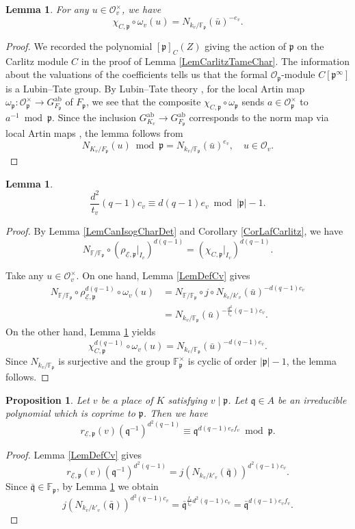 \documentclass[10pt]{amsart}
\theoremstyle{plain}
\newtheorem{prop}[thm]{Proposition}
\newtheorem{lem}[thm]{Lemma}
\theoremstyle{definition}
\newcommand{\ab}{\mathrm{ab}}
\newcommand{\cO}{\mathcal{O}}
\newcommand{\ucE}{\underline{\mathcal{E}}}
\newcommand{\bF}{\mathbb{F}}
\newcommand{\frp}{\mathfrak{p}}
\newcommand{\frq}{\mathfrak{q}}
\begin{document}
\begin{lem}\label{LemCarlitzBaseChange}
	For any $u\in \cO_v^\times$, we have
	\[
	\chi_{C,\frp}\circ \omega_v(u)=N_{k_v/\bF_\frp}(\bar{u})^{-e_v}.
	\]
\end{lem}
\begin{proof}
	We recorded the polynomial $[\frp]_C(Z)$ giving the action of $\frp$ on the Carlitz module $C$ in the proof of Lemma \ref{LemCarlitzTameChar}.
	The information about the valuations of the coefficients tells us that the formal $\cO_\frp$-module $C[\frp^\infty]$ is a Lubin--Tate group.
	By Lubin--Tate theory \cite[\S3.4, Theorem 3]{Serre_LCFT}, for the local Artin map $\omega_\frp:\cO_\frp^\times\to G_{F_\frp}^\ab$ of $F_\frp$, 
	we see that the composite $\chi_{C,\frp}\circ \omega_\frp$ 
	sends
	$a\in \cO_\frp^\times$ to $a^{-1}\bmod \frp$.
	Since the inclusion $G_{K_v}^\ab\to G_{F_\frp}^\ab$ corresponds to the norm map via local Artin maps \cite[\S2.4]{Serre_LCFT}, 
	the lemma follows from 
	\[
	N_{K_v/F_\frp}(u)\bmod \frp=N_{k_v/\bF_\frp}(\bar{u})^{e_v},\quad u\in \cO_v.
	\]
\end{proof}

\begin{lem}\label{LemTvCv}
	\[
	\frac{d^2}{t_v}(q-1)c_v\equiv d(q-1)e_v \bmod |\frp|-1.
	\]
\end{lem}
\begin{proof}
	By Lemma \ref{LemCanIsogCharDet} and Corollary \ref{CorLafCarlitz}, we have
	\[
	N_{\bF/\bF_\frp}\circ (\rho_{\ucE,\frp}|_{I_v})^{d(q-1)}=(\chi_{C,\frp}|_{I_v})^{d(q-1)}.
	\]
	
	Take any $u\in \cO_v^\times$. On one hand, Lemma \ref{LemDefCv} gives
	\[
	\begin{aligned}
		N_{\bF/\bF_\frp}\circ\rho_{\ucE,\frp}^{d(q-1)}\circ \omega_v(u)&=N_{\bF/\bF_\frp}\circ j\circ N_{k_v/k'_v}(\bar{u})^{-d(q-1)c_v}\\
		&=N_{k_v/\bF_\frp}(\bar{u})^{-\frac{d^2}{t_v}(q-1)c_v}.
	\end{aligned}
	\]
	On the other hand, Lemma \ref{LemCarlitzBaseChange} yields
	\[
	\chi_{C,\frp}^{d(q-1)}\circ \omega_v(u)=N_{k_v/\bF_\frp}(\bar{u})^{-d(q-1)e_v}.
	\]
	Since $N_{k_v/\bF_\frp}$ is surjective and the group $\bF_\frp^\times$ is cyclic of order $|\frp|-1$,
	the lemma follows.
\end{proof}

\begin{prop}\label{PropCanIsogCharArtinCong}
	Let $v$ be a place of $K$ satisfying $v\mid \frp$. 
	Let $\frq\in A$ be an irreducible polynomial which is coprime to $\frp$. Then we have
	\[
	r_{\ucE,\frp}(v)(\frq^{-1})^{d^2(q-1)}\equiv \frq^{d (q-1)e_v f_v} \bmod \frp.
	\]
\end{prop}
\begin{proof}
	Lemma \ref{LemDefCv} gives
	\[
	r_{\ucE,\frp}(v)(\frq^{-1})^{d^2(q-1)}=j(N_{k_v/k'_v}(\bar{\frq}))^{d^2(q-1)c_v}.
	\]
	Since $\bar{\frq}\in \bF_\frp$, by Lemma \ref{LemTvCv} we obtain
	\[
	j(N_{k_v/k'_v}(\bar{\frq}))^{d^2(q-1)c_v}=\bar{\frq}^{\frac{f_v}{t_v}d^2(q-1)c_v}=\bar{\frq}^{d(q-1)e_vf_v}.
	\]
\end{proof}
\end{document}
